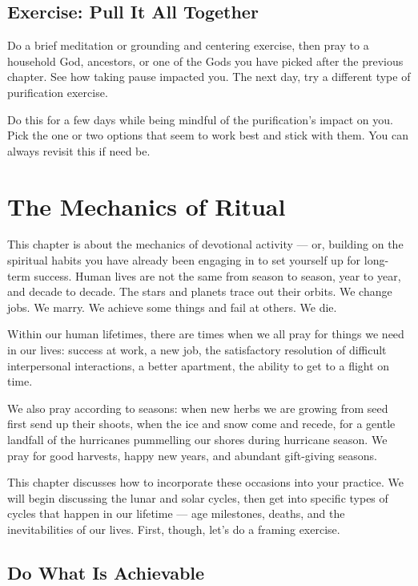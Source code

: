 \documentclass[
]{book}
\begin{document}
\hypertarget{exercise-pull-it-all-together}{%
\section{Exercise: Pull It All Together}\label{exercise-pull-it-all-together}}

Do a brief meditation or grounding and centering exercise, then pray to a household God, ancestors, or one of the Gods you have picked after the previous chapter. See how taking pause impacted you. The next day, try a different type of purification exercise.

Do this for a few days while being mindful of the purification's impact on you. Pick the one or two options that seem to work best and stick with them. You can always revisit this if need be.

\hypertarget{ritual-mechanics}{%
\chapter{The Mechanics of Ritual}\label{ritual-mechanics}}

This chapter is about the mechanics of devotional activity --- or, building on the spiritual habits you have already been engaging in to set yourself up for long-term success. Human lives are not the same from season to season, year to year, and decade to decade. The stars and planets trace out their orbits. We change jobs. We marry. We achieve some things and fail at others. We die.

Within our human lifetimes, there are times when we all pray for things we need in our lives: success at work, a new job, the satisfactory resolution of difficult interpersonal interactions, a better apartment, the ability to get to a flight on time.

We also pray according to seasons: when new herbs we are growing from seed first send up their shoots, when the ice and snow come and recede, for a gentle landfall of the hurricanes pummelling our shores during hurricane season. We pray for good harvests, happy new years, and abundant gift-giving seasons.

This chapter discusses how to incorporate these occasions into your practice. We will begin discussing the lunar and solar cycles, then get into specific types of cycles that happen in our lifetime --- age milestones, deaths, and the inevitabilities of our lives. First, though, let's do a framing exercise.

\hypertarget{do-what-is-achievable}{%
\section{Do What Is Achievable}\label{do-what-is-achievable}}
\end{document}
